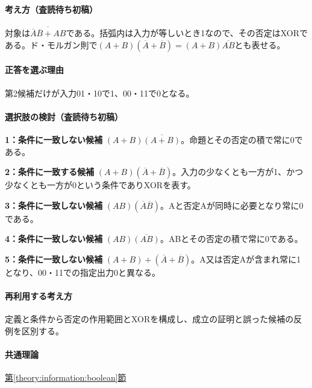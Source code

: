 \paragraph{考え方（査読待ち初稿）} 対象は\(\overline{\overline A\overline B+AB}\)である。括弧内は入力が等しいとき1なので、その否定はXORである。ド・モルガン則で\((A+B)(\overline A+\overline B)=(A+B)\overline{AB}\)とも表せる。

\paragraph{正答を選ぶ理由} 第2候補だけが入力01・10で1、00・11で0となる。

\paragraph{選択肢の検討（査読待ち初稿）}\mbox{}\par

\noindent\textbf{1：条件に一致しない候補} \((A+B)\overline{(A+B)}\)。命題とその否定の積で常に0である。\par

\noindent\textbf{2：条件に一致する候補} \((A+B)(\overline A+\overline B)\)。入力の少なくとも一方が1、かつ少なくとも一方が0という条件でありXORを表す。\par

\noindent\textbf{3：条件に一致しない候補} \((AB)(\overline A\overline B)\)。Aと否定Aが同時に必要となり常に0である。\par

\noindent\textbf{4：条件に一致しない候補} \((AB)\overline{(AB)}\)。ABとその否定の積で常に0である。\par

\noindent\textbf{5：条件に一致しない候補} \((A+B)+(\overline A+\overline B)\)。A又は否定Aが含まれ常に1となり、00・11での指定出力0と異なる。\par

\paragraph{再利用する考え方} 定義と条件から否定の作用範囲とXORを構成し、成立の証明と誤った候補の反例を区別する。

\paragraph{共通理論} \hyperref[theory:information:boolean]{第\ref*{theory:information:boolean}節}

